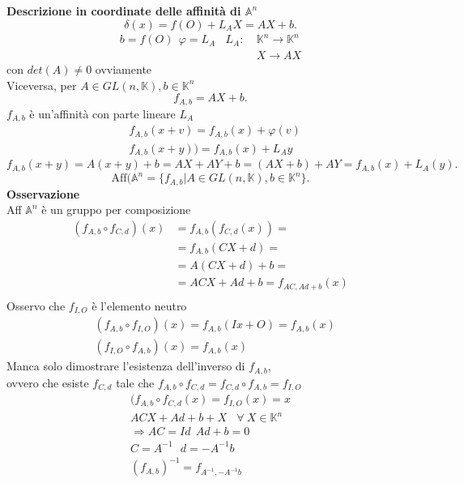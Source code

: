 \documentclass[12px]{article}
\theoremstyle{break}
\theoremstyle{break}
\theoremstyle{break}
\theoremstyle{break}
\theoremstyle{break}
\theoremstyle{break}
\begin{document}
\textbf{Descrizione in coordinate delle affinità di $ \mathbb{A} ^n$} \\
	\[
	\delta (x) = f(O) + L_A X = AX + b
	.\]
	\begin{align*}
		b = f(O) \ \ \varphi = L_A \ \ \ \ L_A : \ &\mathbb{K}^n \rightarrow \mathbb{K}^n \\ 
						    	 & X \rightarrow AX
	\end{align*}
	con $det(A) \neq 0$ ovviamente\\
	Viceversa, per $A\in GL(n,\mathbb{K}), b\in\mathbb{K}^n$\\
	\[
		f_{A,b} = AX + b
	.\] 
	$f_{A,b}$ è un'affinità con parte lineare $L_A$
	\begin{align*}
		& f_{A,b}(x + v) = f_{A,b}(x) + \varphi(v) \\
		& f_{A,b}(x + y)) = f_{A,b}(x) + L_Ay
	\end{align*}
	\[
		f_{A,b}(x + y) = A(x + y) + b = AX + AY + b = (AX + b) + AY = f_{A,b} (x) + L_A(y)
	.\] 
	\[
		\text{Aff}( \mathbb{A}^n =\{f_{A,b} | A\in GL(n,\mathbb{K}), b\in\mathbb{K}^n\}
	.\] 
	\textbf{Osservazione} \\
	Aff $ \mathbb{A} ^n$ è un gruppo per composizione \\ 
	\begin{align*}
		(f_{A,b}\circ f_{C,d})(x)  &= f_{A,b}(f_{C,d}(x)) =\\
					   &= f_{A,b}(CX + d) = \\
					   &=A(CX + d) + b =\\
					   &=ACX + Ad + b = f_{AC, Ad + b}(x) \\
	\end{align*}
	Osservo che $f_{I,O}$ è l'elemento neutro
	\begin{align*}
		&(f_{A,b}\circ f_{I,O})(x) = f_{A,b}(Ix + O) = f_{A,b}(x) \\
		&(f_{I,O}\circ f_{A,b})(x) = f_{A,b}(x)
	\end{align*}
	Manca solo dimostrare l'esistenza dell'inverso di $f_{A,b}$,\\
	ovvero che esiste $f_{C,d}$ tale che $f_{A,b}\circ f_{C,d} = f_{C,d}\circ f_{A,b} = f_{I,O}$
	\begin{align*}
		(f_{A,b}\circ f_{C,d}(x) = f_{I,O}(x) = x \\
		ACX + Ad + b + X \ \ \ \ \forall \  X\in\mathbb{K}^n \\
		\Rightarrow AC = Id \ \ Ad + b = 0\\
		C = A^{-1} \ \ \ d = -A^{-1}b \\
		(f_{A,b})^{-1} = f_{A^{-1}, -A^{-1}b}
	\end{align*}
	
\end{document}
